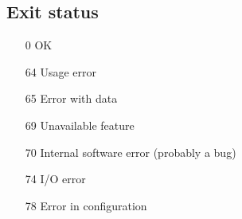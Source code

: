 \documentclass[11pt,twoside,a4paper]{article}
\begin{document}
\vspace{1em}
\subsection{Exit status}
\begin{itemize}
\item[0] OK
\item[64] Usage error
\item[65] Error with data
\item[69] Unavailable feature
\item[70] Internal software error (probably a bug)
\item[74] I/O error
\item[78] Error in configuration
\end{itemize}

%
%
%
%
%


\end{document}
